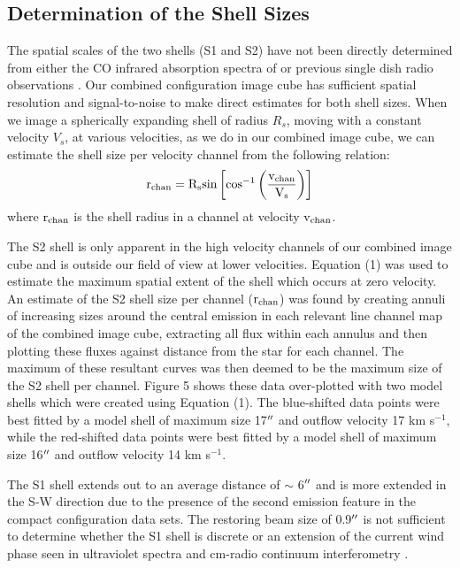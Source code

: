 \documentclass[preprint2]{aastex}
\begin{document}
\subsection{Determination of the Shell Sizes} \label{results3} 
The spatial scales of the two shells (S1 and S2) have not been directly determined from either the CO infrared absorption spectra of \cite{1979ApJ...233L.135B} or previous single dish radio observations \citep{1980ApJ...242L..25K, 1987ApJ...313..400H, 1994ApJ...424L.127H}. Our combined configuration image cube has sufficient spatial resolution and signal-to-noise to make direct estimates for both shell sizes. When we image a spherically expanding shell of radius $R_{s}$,  moving with a constant velocity $V_{s}$, at various velocities, as we do in our combined image cube, we can estimate the shell size per velocity channel from the following relation:
\begin{equation}
\rm{r_{chan}}=R_{s} \rm{sin}\left[\rm{cos}^{-1}\left(\frac{v_{chan}}{V_{s}}\right) \right]
\end{equation} 
where $\rm{r_{chan}}$ is the shell radius in a channel at velocity $\rm{v_{chan}}$. 

The S2 shell is only apparent in the high velocity channels of our combined image cube and is outside our field of view at lower velocities. Equation (1) was used to estimate the maximum spatial extent of the shell which occurs at zero velocity. An estimate of the S2 shell size per channel ($\rm{r_{chan}}$) was found by creating annuli of increasing sizes around the central emission in each relevant line channel map of the combined image cube, extracting all flux within each annulus and then plotting these fluxes against distance from the star for each channel. The maximum of these resultant curves was then deemed to be the maximum size of the S2 shell per channel. Figure 5 shows these data over-plotted with two model shells which were created using Equation (1). The blue-shifted data points were best fitted by a model shell of maximum size 17$\mbox{$^{\prime\prime}$}$ and outflow velocity 17 km s${}^{-1}$, while the red-shifted data points were best fitted by a model shell of maximum size 16$\mbox{$^{\prime\prime}$}$ and outflow velocity 14 km s${}^{-1}$.

The S1 shell extends out to an average distance of $\sim$ 6$\mbox{$^{\prime\prime}$}$ and is more extended in the S-W direction due to the presence of the second emission feature in the compact configuration data sets. The restoring beam size of 0.9$\mbox{$^{\prime\prime}$}$ is not sufficient to determine whether the S1 shell is discrete or an extension of the current wind phase seen in ultraviolet spectra \citep{1997ApJ...479..970C} and cm-radio continuum interferometry \citep{1998Natur.392..575L, harper_2001}.
\end{document}

